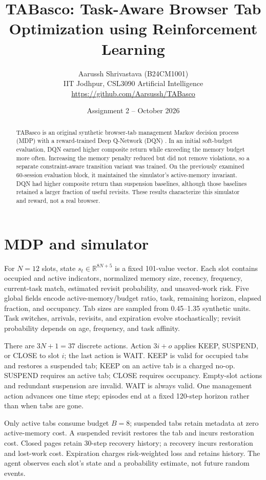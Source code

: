 \documentclass[9pt,twocolumn]{article}
\title{\vspace{-1.5em}\Large\bfseries TABasco: Task-Aware Browser Tab Optimization using Reinforcement Learning}
\author{Aarussh Shrivastava (B24CM1001)\\IIT Jodhpur, CSL3090 Artificial Intelligence\\\url{https://github.com/Aarsussh/TABasco}}
\date{Assignment 2 -- October 2026}
\begin{document}
\maketitle
\vspace{-2em}
\begin{abstract}
TABasco is an original synthetic browser-tab management Markov decision process (MDP) with a reward-trained Deep Q-Network (DQN) \cite{mnih}. In an initial soft-budget evaluation, DQN earned higher composite return while exceeding the memory budget more often. Increasing the memory penalty reduced but did not remove violations, so a separate constraint-aware transition variant was trained. On the previously examined 60-session evaluation block, it maintained the simulator's active-memory invariant. DQN had higher composite return than suspension baselines, although those baselines retained a larger fraction of useful revisits. These results characterize this simulator and reward, not a real browser.
\end{abstract}

\section{MDP and simulator}
For $N=12$ slots, state $s_t\in\mathbb{R}^{8N+5}$ is a fixed 101-value vector. Each slot contains occupied and active indicators, normalized memory size, recency, frequency, current-task match, estimated revisit probability, and unsaved-work risk. Five global fields encode active-memory/budget ratio, task, remaining horizon, elapsed fraction, and occupancy. Tab sizes are sampled from 0.45--1.35 synthetic units. Task switches, arrivals, revisits, and expiration evolve stochastically; revisit probability depends on age, frequency, and task affinity.

There are $3N+1=37$ discrete actions. Action $3i+o$ applies KEEP, SUSPEND, or CLOSE to slot $i$; the last action is WAIT. KEEP is valid for occupied tabs and restores a suspended tab; KEEP on an active tab is a charged no-op. SUSPEND requires an active tab; CLOSE requires occupancy. Empty-slot actions and redundant suspension are invalid. WAIT is always valid. One management action advances one time step; episodes end at a fixed 120-step horizon rather than when tabs are gone.

Only active tabs consume budget $B=8$; suspended tabs retain metadata at zero active-memory cost. A suspended revisit restores the tab and incurs restoration cost. Closed pages retain 30-step recovery history; a recovery incurs restoration and lost-work cost. Expiration charges risk-weighted loss and retains history. The agent observes each slot's state and a probability estimate, not future random events.
\end{document}
